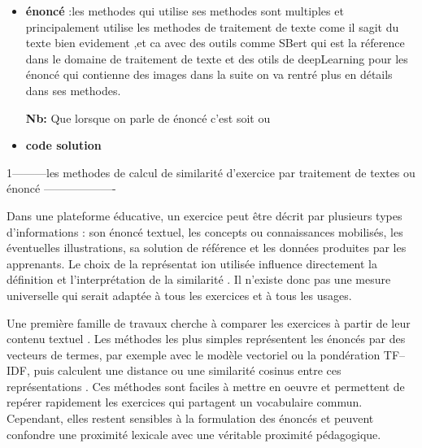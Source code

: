  \begin{itemize}
    \item \textbf{énoncé }:les methodes qui utilise ses methodes sont multiples et
     principalement utilise les methodes de traitement de texte come il sagit du texte bien 
     evidement ,et ca avec des outils comme SBert qui est la réference dans le domaine de traitement 
     de texte et des otils de deepLearning pour les énoncé qui contienne des images dans la suite on va rentré plus en détails dans ses methodes. 
    
    \textbf{Nb:} Que lorsque on parle de énoncé c'est soit 
     ou 



    \item \textbf{code solution} 
    

 \end{itemize}

1---------les methodes de calcul de similarité  d'exercice par traitement de 
textes ou énoncé -------------------




Dans une plateforme éducative, un exercice peut être décrit par plusieurs types d'informations
 : son énoncé textuel, les concepts ou connaissances mobilisés, les éventuelles illustrations, 
 sa solution de référence et les données produites par les apprenants. Le choix de la représentat
 ion utilisée influence directement la définition et l'interprétation de la similarité 
 \cite{pelanek_measuring_2020}. Il n'existe donc pas une mesure universelle qui serait adaptée
  à tous les exercices et à tous les usages.

Une première famille de travaux cherche à comparer les exercices à partir de leur contenu textuel
. Les méthodes les plus simples représentent les énoncés par des vecteurs de termes, par exemple 
avec le modèle vectoriel ou la pondération TF--IDF, puis calculent une distance ou une 
similarité cosinus entre ces représentations \cite{salton_vector_1975}. Ces méthodes sont
 faciles à mettre en oeuvre et permettent de repérer rapidement les exercices qui partagent
  un vocabulaire commun. Cependant, elles restent sensibles à la formulation des énoncés et 
  peuvent confondre une proximité lexicale avec une véritable proximité pédagogique.


